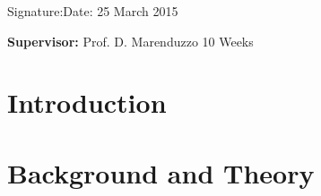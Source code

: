 \documentclass[a4paper,12pt]{article}
\begin{document}
\vspace*{2cm}
Signature:\hspace*{8cm}Date: 25 March 2015

\vfill
{\bf Supervisor:} Prof. D. Marenduzzo                 %
\hfill
10 Weeks                                         %
\newpage
%
\pagestyle{plain}                               %
\setcounter{page}{1}                            %
\tableofcontents                                %

\break
\section{Introduction}

%

\pagebreak
\section{Background and Theory}

%
%
\end{document}

